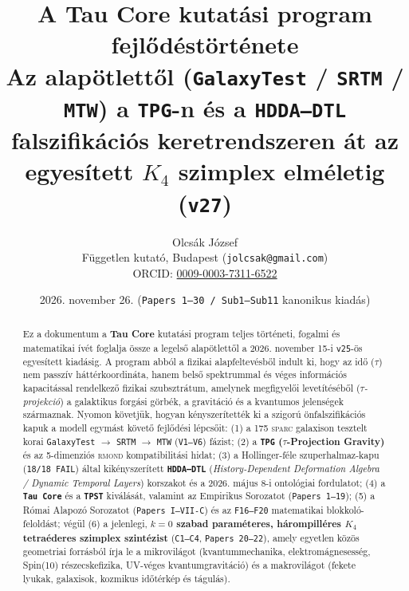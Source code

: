 \documentclass[11pt,a4paper]{article}
\title{\textbf{A Tau Core kutatási program fejl\H{o}déstörténete}\\[0.4em]
\large Az alapötlett\H{o}l (\texttt{GalaxyTest} / \texttt{SRTM} / \texttt{MTW}) a \texttt{TPG}-n és a \texttt{HDDA--DTL} falszifikációs keretrendszeren át az egyesített $K_4$ szimplex elméletig (\texttt{v27})}
\author{Olcsák József\\{\small Független kutató, Budapest (\texttt{jolcsak@gmail.com})}\\{\small ORCID: \href{https://orcid.org/0009-0003-7311-6522}{0009-0003-7311-6522}}}
\date{2026. november 26. (\texttt{Papers 1--30 / Sub1--Sub11} kanonikus kiadás)}
\begin{document}
\maketitle

\begin{abstract}
\noindent
Ez a dokumentum a \textbf{Tau Core} kutatási program teljes történeti, fogalmi és matematikai ívét foglalja össze a legels\H{o} alapötlett\H{o}l a 2026. november 15-i \texttt{v25}-ös egyesített kiadásig. A program abból a fizikai alapfeltevésb\H{o}l indult ki, hogy az id\H{o} ($\tau$) nem passzív háttérkoordináta, hanem bels\H{o} spektrummal és véges információs kapacitással rendelkez\H{o} fizikai szubsztrátum, amelynek megfigyel\H{o}i levetítéséb\H{o}l (\emph{$\tau$-projekció}) a galaktikus forgási görbék, a gravitáció és a kvantumos jelenségek származnak. Nyomon követjük, hogyan kényszerítették ki a szigorú önfalszifikációs kapuk a modell egymást követ\H{o} fejl\H{o}dési lépcs\H{o}it:
(1) a 175 \textsc{sparc} galaxison tesztelt korai \texttt{GalaxyTest} $\to$ \texttt{SRTM} $\to$ \texttt{MTW} (\texttt{V1--V6}) fázist;
(2) a \textbf{\texttt{TPG} ($\tau$-Projection Gravity)} és az 5-dimenziós \textsc{rmond} kompatibilitási hidat;
(3) a Hollinger-féle szuperhalmaz-kapu (\texttt{18/18 FAIL}) által kikényszerített \textbf{\texttt{HDDA--DTL}} (\emph{History-Dependent Deformation Algebra / Dynamic Temporal Layers}) korszakot és a 2026. május 8-i ontológiai fordulatot;
(4) a \textbf{\texttt{Tau Core}} és a \textbf{\texttt{TPST}} kiválását, valamint az Empirikus Sorozatot (\texttt{Papers 1--19});
(5) a Római Alapozó Sorozatot (\texttt{Papers I--VII-C}) és az \texttt{F16--F20} matematikai blokkoló-feloldást; végül
(6) a jelenlegi, \textbf{$k=0$ szabad paraméteres, hárompilléres $K_4$ tetraéderes szimplex szintézist} (\texttt{C1--C4}, \texttt{Papers 20--22}), amely egyetlen közös geometriai forrásból írja le a mikrovilágot (kvantummechanika, elektromágnesesség, \textrm{Spin}(10) részecskefizika, UV-véges kvantumgravitáció) és a makrovilágot (fekete lyukak, galaxisok, kozmikus id\H{o}térkép és tágulás).
\end{abstract}
\end{document}
